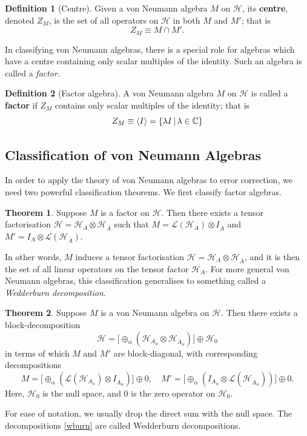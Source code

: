 \documentclass[12pt,a4paper]{report}
\numberwithin{equation}{section}
\newcommand{\ol}[1]{\overline{#1}}
\theoremstyle{definition}
\newtheorem{definition}{Definition}[section]
\theoremstyle{theorem}
\newtheorem{theorem}{Theorem}[section]
\theoremstyle{theorem}
\theoremstyle{example}
\theoremstyle{definition}
\begin{document}
\begin{definition}[Centre]
	Given a von Neumann algebra $M$ on $\mathcal{H}$, its \textbf{centre}, denoted $Z_{M}$, is the set of all operators on $\mathcal{H}$ in both $M$ and $M'$; that is
	\begin{equation}
		Z_{M}\equiv M\cap M'.
	\end{equation}
\end{definition}
In classifying von Neumann algebras, there is a special role for algebras which have a centre containing only scalar multiples of the identity. Such an algebra is called a \textit{factor}.
\begin{definition}[Factor algebra]
	A von Neumann algebra $M$ on $\mathcal{H}$ is called a \textbf{factor} if $Z_{M}$ contains only scalar multiples of the identity; that is
	\begin{equation}
		Z_{M}\equiv\braket{I}=\{\lambda I\,|\,\lambda\in\mathbb{C}\}
	\end{equation}
\end{definition}
\subsection{Classification of von Neumann Algebras}
In order to apply the theory of von Neumann algebras to error correction, we need two powerful classification theorems. We first classify factor algebras.
\begin{theorem}\label{factorclass}
	Suppose $M$ is a factor on $\mathcal{H}$. Then there exists a tensor factorisation $\mathcal{H}=\mathcal{H}_{A}\otimes\mathcal{H}_{\ol{A}}$ such that $M=\mathcal{L}(\mathcal{H}_{A})\otimes I_{\ol{A}}$ and $M'=I_{A}\otimes\mathcal{L}(\mathcal{H}_{\ol{A}})$.
\end{theorem}
In other words, $M$ induces a tensor factorisation $\mathcal{H}=\mathcal{H}_{A}\otimes\mathcal{H}_{\ol{A}}$, and it is then the set of all linear operators on the tensor factor $\mathcal{H}_{A}$. For more general von Neumann algebras, this classification generalises to something called a \textit{Wedderburn decomposition}.
\begin{theorem}\label{vnclass}
	Suppose $M$ is a von Neumann algebra on $\mathcal{H}$. Then there exists a block-decomposition 
	\begin{equation} 
		\mathcal{H}=\big[\oplus_{\alpha}(\mathcal{H}_{A_{\alpha}}\otimes\mathcal{H}_{\ol{A}_{\alpha}})\big]\oplus \mathcal{H}_{0}
	\end{equation}
	in terms of which $M$ and $M'$ are block-diagonal, with corresponding decompositions
	\begin{equation}\label{wburn}
		M=\big[\oplus_{\alpha}(\mathcal{L}(\mathcal{H}_{A_{\alpha}})\otimes I_{\ol{A}_{\alpha}})\big]\oplus0,\quad M'=\big[\oplus_{\alpha}(I_{A_{\alpha}}\otimes\mathcal{L}(\mathcal{H}_{\ol{A}_{\alpha}}))\big]\oplus0.
	\end{equation}
	Here, $\mathcal{H}_{0}$ is the null space, and $0$ is the zero operator on $\mathcal{H}_{0}$.
\end{theorem}
For ease of notation, we usually drop the direct sum with the null space. The decompositions \ref{wburn} are called Wedderburn decompositions.
\end{document}
